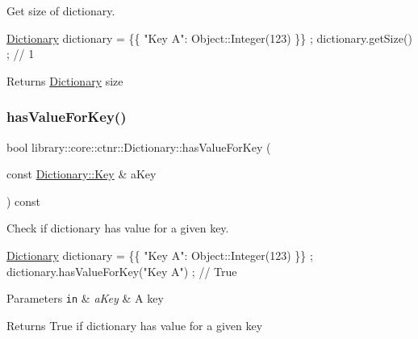 Get size of dictionary. 


\begin{DoxyCode}
\hyperlink{classlibrary_1_1core_1_1ctnr_1_1_dictionary_a823a08112d9ee271f9fa5833f030ea1a}{Dictionary} dictionary = \{\{ \textcolor{stringliteral}{"Key A"}: Object::Integer(123) \}\} ;
dictionary.getSize() ; \textcolor{comment}{// 1}
\end{DoxyCode}


\begin{DoxyReturn}{Returns}
\hyperlink{classlibrary_1_1core_1_1ctnr_1_1_dictionary}{Dictionary} size 
\end{DoxyReturn}
\mbox{\label{classlibrary_1_1core_1_1ctnr_1_1_dictionary_a876171a3a4977a7996e2b02bd53acff7}} 
\subsubsection{\texorpdfstring{has\+Value\+For\+Key()}{hasValueForKey()}}
{\footnotesize\ttfamily bool library\+::core\+::ctnr\+::\+Dictionary\+::has\+Value\+For\+Key (\begin{DoxyParamCaption}\item[{const \hyperlink{classlibrary_1_1core_1_1types_1_1_string}{Dictionary\+::\+Key} \&}]{a\+Key }\end{DoxyParamCaption}) const}



Check if dictionary has value for a given key. 


\begin{DoxyCode}
\hyperlink{classlibrary_1_1core_1_1ctnr_1_1_dictionary_a823a08112d9ee271f9fa5833f030ea1a}{Dictionary} dictionary = \{\{ \textcolor{stringliteral}{"Key A"}: Object::Integer(123) \}\} ;
dictionary.hasValueForKey(\textcolor{stringliteral}{"Key A"}) ; \textcolor{comment}{// True}
\end{DoxyCode}



\begin{DoxyParams}[1]{Parameters}
\mbox{\tt in}  & {\em a\+Key} & A key \\
\hline
\end{DoxyParams}
\begin{DoxyReturn}{Returns}
True if dictionary has value for a given key 
\end{DoxyReturn}
\mbox{\label{classlibrary_1_1core_1_1ctnr_1_1_dictionary_ae6d779460b52c84a71c34f86988c4590}} 
